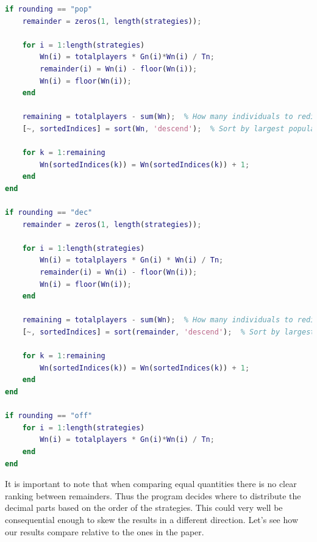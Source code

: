 \documentclass[12pt]{article}
\begin{document}
\begin{lstlisting}[language=Matlab, caption={Full Rounding Logic Implementation}]
%%%%%%%% DECIMAL REDISTRIBUTION %%%%%%%%%%%%%
if rounding == "pop"
    remainder = zeros(1, length(strategies));

    for i = 1:length(strategies)
        Wn(i) = totalplayers * Gn(i)*Wn(i) / Tn;
        remainder(i) = Wn(i) - floor(Wn(i));
        Wn(i) = floor(Wn(i));
    end

    remaining = totalplayers - sum(Wn);  % How many individuals to redistribute
    [~, sortedIndices] = sort(Wn, 'descend');  % Sort by largest populations

    for k = 1:remaining
        Wn(sortedIndices(k)) = Wn(sortedIndices(k)) + 1;
    end
end

if rounding == "dec"
    remainder = zeros(1, length(strategies));

    for i = 1:length(strategies)
        Wn(i) = totalplayers * Gn(i) * Wn(i) / Tn;
        remainder(i) = Wn(i) - floor(Wn(i));
        Wn(i) = floor(Wn(i));
    end

    remaining = totalplayers - sum(Wn);  % How many individuals to redistribute
    [~, sortedIndices] = sort(remainder, 'descend');  % Sort by largest decimals

    for k = 1:remaining
        Wn(sortedIndices(k)) = Wn(sortedIndices(k)) + 1;
    end
end            

if rounding == "off"
    for i = 1:length(strategies)
        Wn(i) = totalplayers * Gn(i)*Wn(i) / Tn;
    end
end
\end{lstlisting}
It is important to note that when comparing equal quantities there is no clear ranking between remainders. Thus the program decides where to distribute the decimal parts based on the order of the strategies. This could very well be consequential enough to skew the results in a different direction. Let's see how our results compare relative to the ones in the paper.
\newpage
\end{document}
